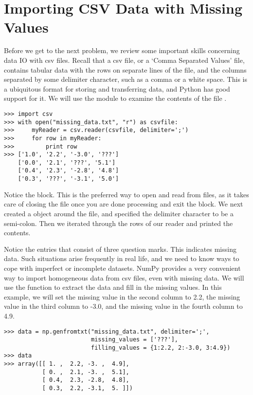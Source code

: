 \section*{Importing CSV Data with Missing Values}
Before we get to the next problem, we review some important skills concerning data IO with csv files. 
Recall that a csv file, or a `Comma Separated Values' file, contains tabular data with the rows on separate lines
of the file, and the columns separated by some delimiter character, such as a comma or a white space. This is a 
ubiquitous format for storing and transferring data, and Python has good support for it. We will use the 
module to examine the contents of the file .

\begin{lstlisting}
>>> import csv
>>> with open("missing_data.txt", "r") as csvfile:
>>>     myReader = csv.reader(csvfile, delimiter=';')
>>>     for row in myReader:
>>>         print row
>>> ['1.0', '2.2', '-3.0', '???']
    ['0.0', '2.1', '???', '5.1']
    ['0.4', '2.3', '-2.8', '4.8']
    ['0.3', '???', '-3.1', '5.0']
\end{lstlisting}

Notice the  block. This is the preferred way to open and read from files, as it takes care of 
closing the file once you are done processing and exit the block. We next created a  object around 
the file, and specified the delimiter character to be a semi-colon. Then we iterated through the rows of our reader
and printed the contents.

Notice the entries that consist of three question marks. This indicates missing data. Such situations arise frequently
in real life, and we need to know ways to cope with imperfect or incomplete datasets. NumPy provides a very convenient
way to import homogeneous data from csv files, even with missing data. We will use the  function to
extract the data and fill in the missing values. In this example, we will set the missing value in the second column to
2.2, the missing value in the third column to -3.0, and the missing value in the fourth column to 4.9.

\begin{lstlisting}
>>> data = np.genfromtxt("missing_data.txt", delimiter=';',
                         missing_values = ['???'],
                         filling_values = {1:2.2, 2:-3.0, 3:4.9})
>>> data
>>> array([[ 1. ,  2.2, -3. ,  4.9],
           [ 0. ,  2.1, -3. ,  5.1],
           [ 0.4,  2.3, -2.8,  4.8],
           [ 0.3,  2.2, -3.1,  5. ]])
\end{lstlisting}

